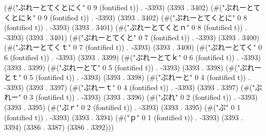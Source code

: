 (#("ぷれーとてくとにく" 0 9 (fontified t)) . -3393) (3393 . 3402) (#("ぷれーとてくとにｋ" 0 9 (fontified t)) . -3393) (3393 . 3402) (#("ぷれーとてくとに" 0 8 (fontified t)) . -3393) (3393 . 3401) (#("ぷれーとてくとｎ" 0 8 (fontified t)) . -3393) (3393 . 3401) (#("ぷれーとてくと" 0 7 (fontified t)) . -3393) (3393 . 3400) (#("ぷれーとてくｔ" 0 7 (fontified t)) . -3393) (3393 . 3400) (#("ぷれーとてく" 0 6 (fontified t)) . -3393) (3393 . 3399) (#("ぷれーとてｋ" 0 6 (fontified t)) . -3393) (3393 . 3399) (#("ぷれーとて" 0 5 (fontified t)) . -3393) (3393 . 3398) (#("ぷれーとｔ" 0 5 (fontified t)) . -3393) (3393 . 3398) (#("ぷれーと" 0 4 (fontified t)) . -3393) (3393 . 3397) (#("ぷれーｔ" 0 4 (fontified t)) . -3393) (3393 . 3397) (#("ぷれー" 0 3 (fontified t)) . -3393) (3393 . 3396) (#("ぷれ" 0 2 (fontified t)) . -3393) (3393 . 3395) (#("ぷｒ" 0 2 (fontified t)) . -3393) (3393 . 3395) (#("ぷ" 0 1 (fontified t)) . -3393) (3393 . 3394) (#("ｐ" 0 1 (fontified t)) . -3393) (3393 . 3394) (3386 . 3387) (3386 . 3392)))
